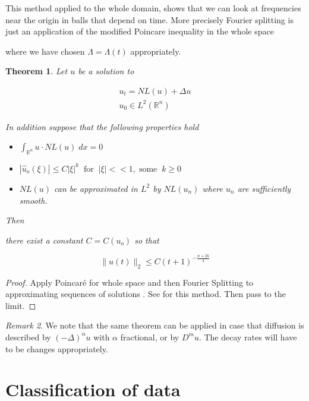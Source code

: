 \documentclass{amsart}
\newtheorem {Theorem}  {Theorem}
\numberwithin{Theorem}{section}
\numberwithin{equation}{section}
\theoremstyle{definition}
\theoremstyle{remark}
\newtheorem{Remark}[Theorem]{Remark}
\begin{document}
This method  applied  to the whole domain,  shows that we can look at  frequencies near the origin in balls that   depend on time. More precisely  Fourier splitting is just an application of the modified  Poincare  inequality in the whole space

where we have chosen $\Lambda =\Lambda(t)$  appropriately.

\begin{Theorem} \label{theo:NL} Let  $ u $ be a solution to

\begin{align} \label{eq:NL}
u_t = NL(u) + \Delta u\\
u_0\in L^2({{\mathbb R}^n})
\end{align}

In addition suppose that the following properties hold

\begin{itemize}
\item $\int_{{\mathbb R}^n} u \cdot NL(u) \;dx =0 $
\item $|\widehat{u}_o(\xi)| \leq C|\xi|^k \;\;\mbox{for}\;\;|\xi| << 1, \; \mbox{some}\;\;k\geq 0$
\item $NL(u)$ can be approximated in $L^2$ by  $NL(u_n)$ where $u_n$ are sufficiently smooth.
\end{itemize}

Then

 there exist a constant $C= C(u_o)$ so that

 \[\|u(t)\|_2 \leq C(t+1) ^{-\frac{n+2k}{4}}\]

 \end{Theorem}

\begin{proof}

Apply Poincar\'e for whole space and then Fourier Splitting to approximating sequences of solutions . See \cite{S} for this method. Then pass to the limit.

\end{proof}

\begin{Remark}

We note that the same theorem can be applied in case that diffusion is described by $(-\Delta)^{\alpha} u$ with $\alpha$ fractional, or by $D^m u$. The decay rates will have to be changes appropriately.
\end{Remark}

\section{ Classification of data}
\end{document}
